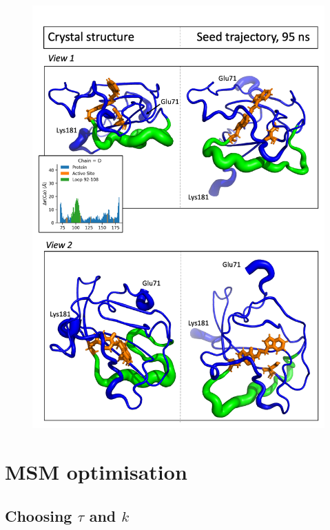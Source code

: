 \begin{figure}
    \centering
    \label{fig:chain_d_loop}
    \includegraphics[height=0.9\textheight]{rmsd_seg_d.png}
\end{figure}

\section{MSM optimisation}

\subsection{Choosing $\tau$ and $k$}

